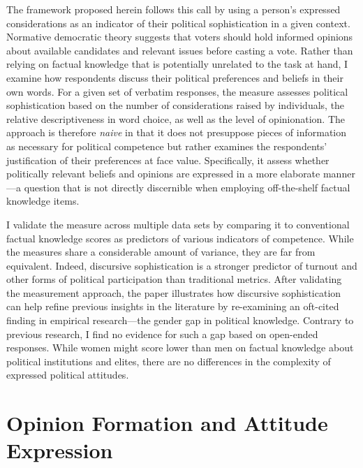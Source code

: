 The framework proposed herein follows this call by using a person's expressed considerations as an indicator of their political sophistication in a given context. Normative democratic theory suggests that voters should hold informed opinions about available candidates and relevant issues before casting a vote. Rather than relying on factual knowledge that is potentially unrelated to the task at hand, I examine how respondents discuss their political preferences and beliefs in their own words. For a given set of verbatim responses, the measure assesses political sophistication based on the number of considerations raised by individuals, the relative descriptiveness in word choice, as well as the level of opinionation. The approach is therefore \textit{naive} in that it does not presuppose pieces of information as necessary for political competence but rather examines the respondents' justification of their preferences at face value. Specifically, it assess whether politically relevant beliefs and opinions are expressed in a more elaborate manner---a question that is not directly discernible when employing off-the-shelf factual knowledge items. 

I validate the measure across multiple data sets by comparing it to conventional factual knowledge scores as predictors of various indicators of competence. While the measures share a considerable amount of variance, they are far from equivalent. Indeed, discursive sophistication is a stronger predictor of turnout and other forms of political participation than traditional metrics. After validating the measurement approach, the paper illustrates how discursive sophistication can help refine previous insights in the literature by re-examining an oft-cited finding in empirical research---the gender gap in political knowledge. Contrary to previous research, I find no evidence for such a gap based on open-ended responses. While women might score lower than men on factual knowledge about political institutions and elites, there are no differences in the complexity of expressed political attitudes.



\section{Opinion Formation and Attitude Expression}


